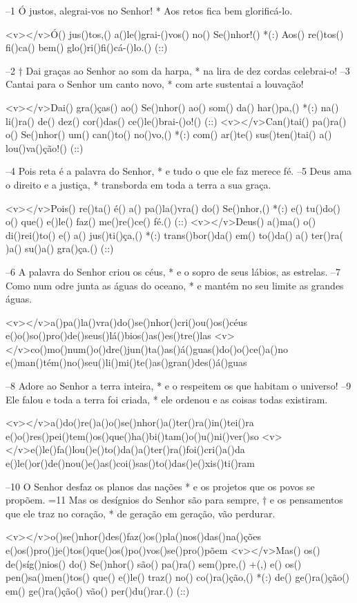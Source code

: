 –1 Ó justos, alegrai-vos no Senhor! *
Aos retos fica bem glorificá-lo.


<v></v>Ó() jus()tos,() a()le()grai-()vos() no() Se()nhor!() *(:)
Aos() re()tos() fi()ca() bem() glo()ri()fi()cá-()lo.() (::)

–2 † Dai graças ao Senhor ao som da harpa, *
na lira de dez cordas celebrai-o!
–3 Cantai para o Senhor um canto novo, *
com arte sustentai a louvação!

<v></v>Dai() gra()ças() ao() Se()nhor() ao() som() da() har()pa,() *(:)
na() li()ra() de() dez() cor()das() ce()le()brai-()o!() (::)
<v></v>Can()tai() pa()ra() o() Se()nhor() um() can()to() no()vo,() *(:)
com() ar()te() sus()ten()tai() a() lou()va()ção!() (::)

–4 Pois reta é a palavra do Senhor, *
e tudo o que ele faz merece fé.
–5 Deus ama o direito e a justiça, *
transborda em toda a terra a sua graça.

<v></v>Pois() re()ta() é() a() pa()la()vra() do() Se()nhor,() *(:)
e() tu()do() o() que() e()le() faz() me()re()ce() fé.() (::)
<v></v>Deus() a()ma() o() di()rei()to() e() a() jus()ti()ça,() *(:)
trans()bor()da() em() to()da() a() ter()ra( )a() su()a() gra()ça.() (::)

–6 A palavra do Senhor criou os céus, *
e o sopro de seus lábios, as estrelas.
–7 Como num odre junta as águas do oceano, *
e mantém no seu limite as grandes águas.

<v></v>a()pa()la()vra()do()se()nhor()cri()ou()os()céus
e()o()so()pro()de()seus()lá()bios()as()es()tre()las
<v></v>co()mo()num()o()dre()jun()ta()as()á()guas()do()o()ce()a()no
e()man()tém()no()seu()li()mi()te()as()gran()des()á()guas

–8 Adore ao Senhor a terra inteira, *
e o respeitem os que habitam o universo!
–9 Ele falou e toda a terra foi criada, *
ele ordenou e as coisas todas existiram.

<v></v>a()do()re()a()o()se()nhor()a()ter()ra()in()tei()ra
e()o()res()pei()tem()os()que()ha()bi()tam()o()u()ni()ver()so
<v></v>e()le()fa()lou()e()to()da()a()ter()ra()foi()cri()a()da
e()le()or()de()nou()e()as()coi()sas()to()das()e()xis()ti()ram

–10 O Senhor desfaz os planos das nações *
e os projetos que os povos se propõem.
=11 Mas os desígnios do Senhor são para sempre, †
e os pensamentos que ele traz no coração, *
de geração em geração, vão perdurar.

<v></v>o()se()nhor()des()faz()os()pla()nos()das()na()ções
e()os()pro()je()tos()que()os()po()vos()se()pro()põem
<v></v>Mas() os() de()síg()nios() do() Se()nhor() são() pa()ra() sem()pre,() +(,)
e() os() pen()sa()men()tos() que() e()le() traz() no() co()ra()ção,() *(:)
de() ge()ra()ção() em() ge()ra()ção() vão() per()du()rar.() (::)

